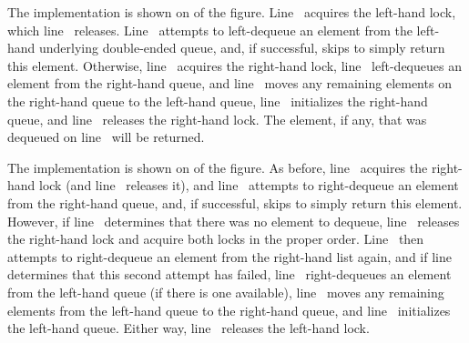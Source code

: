 \begin{fcvref}
The  implementation is shown on
of the figure.
Line~ acquires the left-hand lock,
which line~ releases.
Line~ attempts to left-dequeue an element
from the left-hand underlying
double-ended queue, and, if successful,
skips  to simply
return this element.
Otherwise, line~ acquires the right-hand lock, line~
left-dequeues an element from the right-hand queue,
and line~ moves any remaining elements on the right-hand
queue to the left-hand queue, line~ initializes
the right-hand queue,
and line~ releases the right-hand lock.
The element, if any, that was dequeued on line~ will be returned.
\end{fcvref}

\begin{fcvref}
The  implementation is shown on 
of the figure.
As before, line~ acquires the right-hand lock
(and line~
releases it), and line~ attempts to right-dequeue an element
from the right-hand queue, and, if successful,
skips 
to simply return this element.
However, if line~ determines that there was no element to dequeue,
line~ releases the right-hand lock and
 acquire both
locks in the proper order.
Line~ then attempts to right-dequeue an element
from the right-hand
list again, and if line~ determines that this second attempt has
failed, line~ right-dequeues an element from the left-hand queue
(if there is one available), line~ moves any remaining elements
from the left-hand queue to the right-hand queue, and line~
initializes the left-hand queue.
Either way, line~ releases the left-hand lock.
\end{fcvref}

